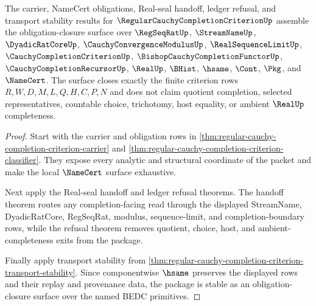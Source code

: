 \begin{theorem}
\label{thm:regular-cauchy-completion-criterion-obligation-closure}
The carrier, NameCert obligations, Real-seal handoff, ledger refusal, and transport stability results for $\RegularCauchyCompletionCriterionUp$ assemble the obligation-closure surface over $\RegSeqRatUp$, $\StreamNameUp$, $\DyadicRatCoreUp$, $\CauchyConvergenceModulusUp$, $\RealSequenceLimitUp$, $\CauchyCompletionCriterionUp$, $\BishopCauchyCompletionFunctorUp$, $\CauchyCompletionRecursorUp$, $\RealUp$, $\BHist$, $\hsame$, $\Cont$, $\Pkg$, and $\NameCert$. The surface closes exactly the finite criterion rows $R,W,D,M,L,Q,H,C,P,N$ and does not claim quotient completion, selected representatives, countable choice, trichotomy, host equality, or ambient $\RealUp$ completeness.
\end{theorem}
\begin{proof}
Start with the carrier and obligation rows in \autoref{thm:regular-cauchy-completion-criterion-carrier} and \autoref{thm:regular-cauchy-completion-criterion-classifier}. They expose every analytic and structural coordinate of the packet and make the local $\NameCert$ surface exhaustive.

Next apply the Real-seal handoff and ledger refusal theorems. The handoff theorem routes any completion-facing read through the displayed StreamName, DyadicRatCore, RegSeqRat, modulus, sequence-limit, and completion-boundary rows, while the refusal theorem removes quotient, choice, host, and ambient-completeness exits from the package.

Finally apply transport stability from \autoref{thm:regular-cauchy-completion-criterion-transport-stability}. Since componentwise $\hsame$ preserves the displayed rows and their replay and provenance data, the package is stable as an obligation-closure surface over the named BEDC primitives.
\end{proof}

